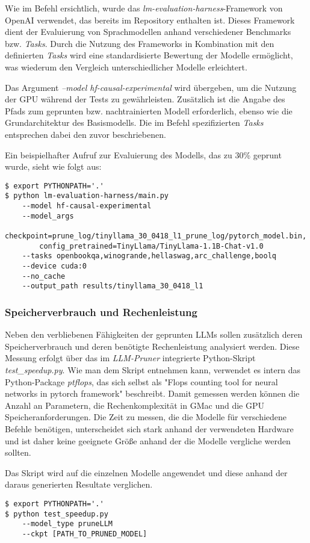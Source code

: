 Wie im Befehl ersichtlich, wurde das \emph{lm-evaluation-harness}-Framework von
OpenAI verwendet, das bereits im Repository enthalten ist. Dieses Framework
dient der Evaluierung von Sprachmodellen anhand verschiedener Benchmarks bzw.
\emph{Tasks}. Durch die Nutzung des Frameworks in Kombination mit den
definierten \emph{Tasks} wird eine standardisierte Bewertung der Modelle
ermöglicht, was wiederum den Vergleich unterschiedlicher Modelle erleichtert.

Das Argument \emph{--model hf-causal-experimental} wird übergeben, um die
Nutzung der GPU während der Tests zu gewährleisten. Zusätzlich ist die Angabe
des Pfads zum geprunten bzw. nachtrainierten Modell erforderlich, ebenso wie die
Grundarchitektur des Basismodells. Die im Befehl spezifizierten \emph{Tasks}
entsprechen dabei den zuvor beschriebenen.

Ein beispielhafter Aufruf zur Evaluierung des Modells, das zu 30\% geprunt wurde,
sieht wie folgt aus:

\vspace{1em}
\begin{lstlisting}
$ export PYTHONPATH='.'
$ python lm-evaluation-harness/main.py
    --model hf-causal-experimental
    --model_args
        checkpoint=prune_log/tinyllama_30_0418_l1_prune_log/pytorch_model.bin,
        config_pretrained=TinyLlama/TinyLlama-1.1B-Chat-v1.0
    --tasks openbookqa,winogrande,hellaswag,arc_challenge,boolq
    --device cuda:0
    --no_cache
    --output_path results/tinyllama_30_0418_l1
\end{lstlisting}

\subsubsection{Speicherverbrauch und Rechenleistung}

Neben den verbliebenen Fähigkeiten der geprunten LLMs sollen zusätzlich deren
Speicherverbrauch und deren benötigte Rechenleistung analysiert werden. Diese
Messung erfolgt über das im \emph{LLM-Pruner} integrierte Python-Skript
\emph{test\_speedup.py}. Wie man dem Skript entnehmen kann, verwendet es intern
das Python-Package \emph{ptflops}, das sich selbst als "Flops counting tool for
neural networks in pytorch framework"\autocite[Vgl.][]{ptflops} beschreibt.
Damit gemessen werden können die Anzahl an Parametern, die Rechenkomplexität in
GMac und die GPU Speicheranforderungen. Die Zeit zu messen, die die Modelle für
verschiedene Befehle benötigen, unterscheidet sich stark anhand der verwendeten
Hardware und ist daher keine geeignete Größe anhand der die Modelle vergliche
werden sollten.

Das Skript wird auf die einzelnen Modelle angewendet und diese anhand der daraus
generierten Resultate verglichen.

\vspace{1em}
\begin{lstlisting}
$ export PYTHONPATH='.'
$ python test_speedup.py
    --model_type pruneLLM
    --ckpt [PATH_TO_PRUNED_MODEL]
\end{lstlisting}

\newpage
